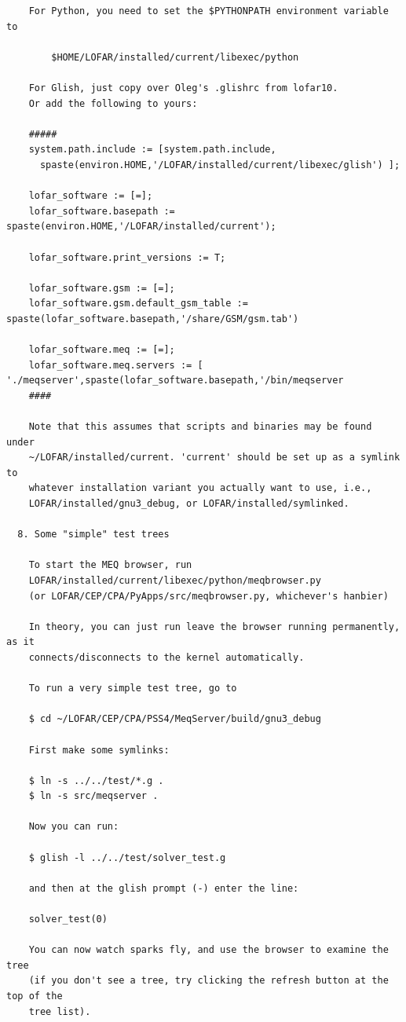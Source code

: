 \documentclass[10pt]{article}
\begin{document}
\begin{verbatim}
    For Python, you need to set the $PYTHONPATH environment variable to

        $HOME/LOFAR/installed/current/libexec/python

    For Glish, just copy over Oleg's .glishrc from lofar10. 
    Or add the following to yours:

    #####
    system.path.include := [system.path.include,
      spaste(environ.HOME,'/LOFAR/installed/current/libexec/glish') ];

    lofar_software := [=];
    lofar_software.basepath := spaste(environ.HOME,'/LOFAR/installed/current');

    lofar_software.print_versions := T;

    lofar_software.gsm := [=];
    lofar_software.gsm.default_gsm_table := spaste(lofar_software.basepath,'/share/GSM/gsm.tab')

    lofar_software.meq := [=];
    lofar_software.meq.servers := [ './meqserver',spaste(lofar_software.basepath,'/bin/meqserver
    ####

    Note that this assumes that scripts and binaries may be found under
    ~/LOFAR/installed/current. 'current' should be set up as a symlink to
    whatever installation variant you actually want to use, i.e.,
    LOFAR/installed/gnu3_debug, or LOFAR/installed/symlinked.

  8. Some "simple" test trees

    To start the MEQ browser, run 
    LOFAR/installed/current/libexec/python/meqbrowser.py
    (or LOFAR/CEP/CPA/PyApps/src/meqbrowser.py, whichever's hanbier)

    In theory, you can just run leave the browser running permanently, as it
    connects/disconnects to the kernel automatically.

    To run a very simple test tree, go to 

    $ cd ~/LOFAR/CEP/CPA/PSS4/MeqServer/build/gnu3_debug

    First make some symlinks:

    $ ln -s ../../test/*.g .
    $ ln -s src/meqserver .

    Now you can run:

    $ glish -l ../../test/solver_test.g

    and then at the glish prompt (-) enter the line:

    solver_test(0)

    You can now watch sparks fly, and use the browser to examine the tree
    (if you don't see a tree, try clicking the refresh button at the top of the
    tree list).


\end{verbatim}
\end{document}
